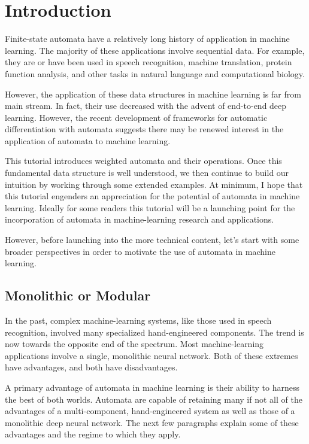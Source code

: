 \section{Introduction}
\label{sec:introduction}

Finite-state automata have a relatively long history of application
in machine learning. The majority of these applications involve sequential
data.  For example, they are or have been used in speech recognition, machine
translation, protein function analysis, and other tasks in natural language
and computational biology.

However, the application of these data structures in machine learning is far
from main stream. In fact, their use decreased with the advent of end-to-end
deep learning. However, the recent development of frameworks for automatic
differentiation with automata suggests there may be renewed interest in the
application of automata to machine learning.

This tutorial introduces weighted automata and their operations. Once this
fundamental data structure is well understood, we then continue to build our
intuition by working through some extended examples. At minimum, I hope that
this tutorial engenders an appreciation for the potential of automata in
machine learning. Ideally for some readers this tutorial will be a launching
point for the incorporation of automata in machine-learning research and
applications.

However, before launching into the more technical content, let's start with
some broader perspectives in order to motivate the use of automata in machine
learning.

\subsection{Monolithic or Modular}

In the past, complex machine-learning systems, like those used in speech
recognition, involved many specialized hand-engineered components. The trend is
now towards the opposite end of the spectrum. Most machine-learning applications
involve a single, monolithic neural network. Both of these extremes have
advantages, and both have disadvantages.

A primary advantage of automata in machine learning is their ability to harness
the best of both worlds. Automata are capable of retaining many if not all of
the advantages of a multi-component, hand-engineered system as well as those of
a monolithic deep neural network. The next few paragraphs explain some of these
advantages and the regime to which they apply.

